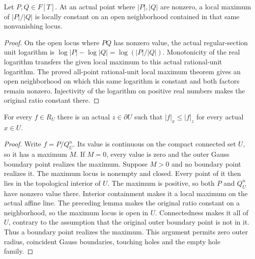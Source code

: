 \begin{lemma}\label{lem:fc-positive-rational-local-maximum}
\leanok
{}
Let $P,Q\in F[T]$. At an actual point where $|P|,|Q|$ are nonzero, a local
maximum of $|P|/|Q|$ is locally constant on an open neighborhood contained
in that same nonvanishing locus.
\end{lemma}
\begin{proof}
On the open locus where $PQ$ has nonzero value, the actual regular-section
unit logarithm is $\log|P|-\log|Q|=\log(|P|/|Q|)$.
Monotonicity of the real logarithm transfers the given local maximum to this
actual rational-unit logarithm. The proved all-point rational-unit local
maximum theorem gives an open neighborhood on which this same logarithm is
constant and both factors remain nonzero. Injectivity of the logarithm on
positive real numbers makes the original ratio constant there.
\end{proof}

\begin{theorem}\label{thm:fc-rational-boundary-maximum}
\leanok
{}
For every $f\in R_U$ there is an actual $z\in\partial U$ such that
$|f|_x\le |f|_z$ for every actual $x\in U$.
\end{theorem}
\begin{proof}
Write $f=P/Q_U^n$. Its value is continuous on the compact connected set $U$,
so it has a maximum $M$. If $M=0$, every value is zero and the outer Gauss
boundary point realizes the maximum. Suppose $M>0$ and no boundary point
realizes it. The maximum locus is nonempty and closed. Every point of it
then lies in the topological interior of $U$. The maximum is positive, so
both $P$ and $Q_U^n$ have nonzero value there. Interior containment makes it
a local maximum on the actual affine line. The preceding lemma makes the
original ratio constant on a neighborhood, so the maximum locus is open
in $U$. Connectedness makes it all of $U$, contrary to the assumption that
the original outer boundary point is not in it. Thus a boundary point
realizes the maximum. This argument permits zero outer radius, coincident
Gauss boundaries, touching holes and the empty hole family.
\end{proof}
